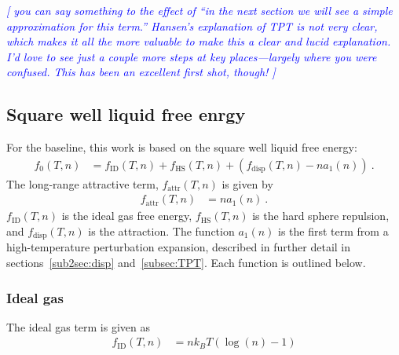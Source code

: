 \documentclass[letterpaper,twocolumn,amsmath,amssymb,prb]{revtex4-1}
\newcommand{\kT}{\ensuremath{k_BT}}
\newcommand{\fid}{\ensuremath{f_\text{ID}(T,n)}}
\newcommand{\fhs}{\ensuremath{f_\text{HS}(T,n)}}
\newcommand{\fdisp}{\ensuremath{f_\text{disp}(T,n)}}
\newcommand{\fattr}{\ensuremath{f_\text{attr}(T,n)}}
\newcommand{\1}{\ensuremath{\textbf{r}_1}}
\newcommand{\2}{\ensuremath{\textbf{r}_2}}
\newcommand{\3}{\ensuremath{\textbf{r}_3}}
\newcommand{\4}{\ensuremath{\textbf{r}_4}}
\newcommand{\davidsays}[1]{\textcolor{blue}{\textit{[#1]}}}
\begin{document}
\davidsays{ you can say something to the effect
  of ``in the next section we will see a simple approximation for this
  term.''  Hansen's explanation of TPT is not very clear, which makes
  it all the more valuable to make \emph{this} a clear and lucid
  explanation.  I'd love to see just a couple more steps at key
  places---largely where you were confused. This
  has been an excellent first shot, though! }


\subsection{Square well liquid free enrgy}\label{subsec:SW}
For the baseline, this work is based on the square well liquid free energy:\cite{Hughes13}
\begin{align}
  f_0(T,n) &= \fid + \fhs + \left( \fdisp - n a_1(n) \right) \ .
\end{align}
The long-range attractive term, $\fattr$ is given by
\begin{align}
  \fattr &= n a_1(n) \ .
\end{align}
$\fid$ is the ideal gas free energy, $\fhs$ is the hard sphere
repulsion, and $\fdisp$ is the attraction. The function $a_1(n)$ is
the first term from a high-temperature perturbation expansion,
described in further detail in sections~\ref{sub2sec:disp}
and~\ref{subsec:TPT}. Each function is outlined below.

\subsubsection{Ideal gas}\label{sub2sec:ID}
The ideal gas term is given as
\begin{align}
  \fid &= n\kT\left(\log(n) - 1\right)
\end{align}
\end{document}
